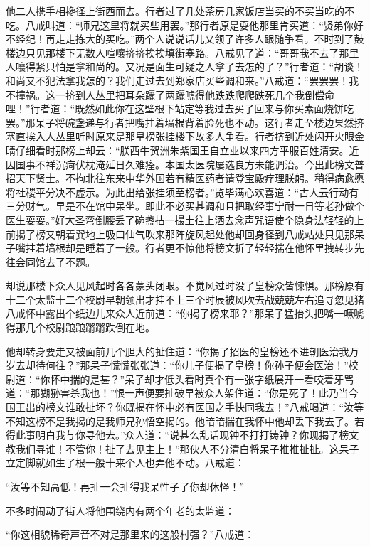 \documentclass[12pt,UTF8]{ctexbook}
\begin{document}
他二人携手相搀径上街西而去。行者过了几处茶房几家饭店当买的不买当吃的不吃。八戒叫道：“师兄这里将就买些用罢。”那行者原是耍他那里肯买道：“贤弟你好不经纪！再走走拣大的买吃。”两个人说说话儿又领了许多人跟随争看。不时到了鼓楼边只见那楼下无数人喧嚷挤挤挨挨填街塞路。八戒见了道：“哥哥我不去了那里人嚷得紧只怕是拿和尚的。又况是面生可疑之人拿了去怎的了？”行者道：“胡谈！和尚又不犯法拿我怎的？我们走过去到郑家店买些调和来。”八戒道：“罢罢罢！我不撞祸。这一挤到人丛里把耳朵躧了两躧唬得他跌跌爬爬跌死几个我倒偿命哩！”行者道：“既然如此你在这壁根下站定等我过去买了回来与你买素面烧饼吃罢。”那呆子将碗盏递与行者把嘴拄着墙根背着脸死也不动。这行者走至楼边果然挤塞直挨入人丛里听时原来是那皇榜张挂楼下故多人争看。行者挤到近处闪开火眼金睛仔细看时那榜上却云：“朕西牛贺洲朱紫国王自立业以来四方平服百姓清安。近因国事不祥沉疴伏枕淹延日久难痊。本国太医院屡选良方未能调治。今出此榜文普招天下贤士。不拘北往东来中华外国若有精医药者请登宝殿疗理朕躬。稍得病愈愿将社稷平分决不虚示。为此出给张挂须至榜者。”览毕满心欢喜道：“古人云行动有三分财气。早是不在馆中呆坐。即此不必买甚调和且把取经事宁耐一日等老孙做个医生耍耍。”好大圣弯倒腰丢了碗盏拈一撮土往上洒去念声咒语使个隐身法轻轻的上前揭了榜又朝着巽地上吸口仙气吹来那阵旋风起处他却回身径到八戒站处只见那呆子嘴拄着墙根却是睡着了一般。行者更不惊他将榜文折了轻轻揣在他怀里拽转步先往会同馆去了不题。

却说那楼下众人见风起时各各蒙头闭眼。不觉风过时没了皇榜众皆悚惧。那榜原有十二个太监十二个校尉早朝领出才挂不上三个时辰被风吹去战兢兢左右追寻忽见猪八戒怀中露出个纸边儿来众人近前道：“你揭了榜来耶？”那呆子猛抬头把嘴一噘唬得那几个校尉踉踉蹡蹡跌倒在地。

他却转身要走又被面前几个胆大的扯住道：“你揭了招医的皇榜还不进朝医治我万岁去却待何往？”那呆子慌慌张张道：“你儿子便揭了皇榜！你孙子便会医治！”校尉道：“你怀中揣的是甚？”呆子却才低头看时真个有一张字纸展开一看咬着牙骂道：“那猢狲害杀我也！”恨一声便要扯破早被众人架住道：“你是死了！此乃当今国王出的榜文谁敢扯坏？你既揭在怀中必有医国之手快同我去！”八戒喝道：“汝等不知这榜不是我揭的是我师兄孙悟空揭的。他暗暗揣在我怀中他却丢下我去了。若得此事明白我与你寻他去。”众人道：“说甚么乱话现钟不打打铸钟？你现揭了榜文教我们寻谁！不管你！扯了去见主上！”那伙人不分清白将呆子推推扯扯。这呆子立定脚就如生了根一般十来个人也弄他不动。八戒道：

“汝等不知高低！再扯一会扯得我呆性子了你却休怪！”

不多时闹动了街人将他围绕内有两个年老的太监道：

“你这相貌稀奇声音不对是那里来的这般村强？”八戒道：
\end{document}
